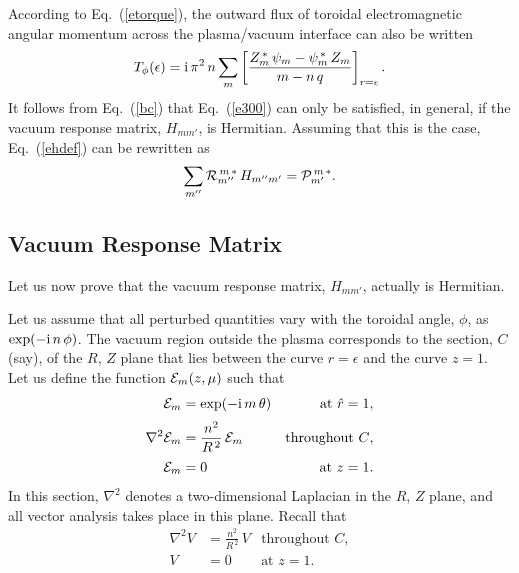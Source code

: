 \documentclass[12pt,prb,aps]{revtex4-1}
\begin{document}
According to Eq.~(\ref{etorque}), the outward flux of toroidal electromagnetic angular momentum across the plasma/vacuum interface can also be written
\begin{equation}
T_\phi(\epsilon) = {\rm i}\,\pi^2\,n\sum_m\left[\frac{Z_m^{\,\ast}\,\psi_m-\psi_m^{\,\ast}\,Z_m}{m-n\,q}\right]_{r=\epsilon}.
\end{equation}
It follows from Eq.~(\ref{bc}) that Eq.~(\ref{e300}) can only be satisfied, in general, if the vacuum
response matrix, $H_{mm'}$, is Hermitian. Assuming that this is the case, Eq.~(\ref{ehdef}) can be rewritten
as 
\begin{equation}
\sum_{m''} {\cal R}_{m''}^{\,m\,\ast}\,H_{m''m'} = {\cal P}_{m'}^{\,m\,\ast}.
\end{equation}

\subsection{Vacuum Response Matrix}\label{svacsoln1}
Let us now prove that the vacuum response matrix, $H_{mm'}$,  actually is Hermitian. 

Let us assume that all perturbed quantities vary with the toroidal angle, $\phi$, as $\exp(-{\rm i}\,n\,\phi)$. 
The vacuum region outside the plasma corresponds to the section, $C$ (say), of the $R$, $Z$ plane that lies between
the curve $r=\epsilon$ and the curve $z=1$. 
Let us define the function ${\cal E}_m(z,\mu)$ such that
\begin{align}\label{e358}
{\cal E}_m&= \exp(-{\rm i}\,m\,\theta) &\mbox{at $\hat{r}=1$},\\[0.5ex]
\nabla^2{\cal E}_m &= \frac{n^2}{R^{\,2}}\,{\cal E}_m &\mbox{throughout $C$},\label{e359}\\[0.5ex]
{\cal E}_m &= 0& \mbox{at $z=1$}.\label{e360}
\end{align}
In this section, $\nabla^2$  denotes a two-dimensional Laplacian in the $R$, $Z$ plane, and all vector analysis takes place in this plane. 
Recall that
\begin{align}
\nabla^2 V &= \frac{n^2}{R^{\,2}}\,V &\mbox{throughout $C$},\label{e361}\\[0.5ex]
V&= 0& \mbox{at $z=1$}.\label{e362}
\end{align}
\end{document}
